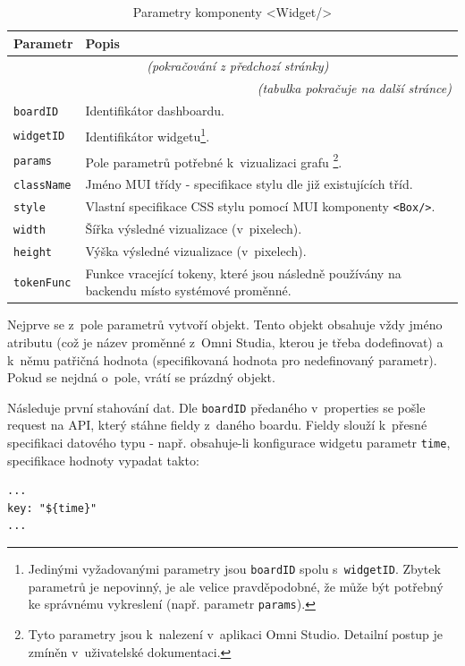\documentclass[czech, bc, kiv, he, iso690numb]{fasthesis}
\begin{document}
	\begin{longtable}{p{}p{}}
	\caption{Parametry komponenty <Widget/>}
	\label{tab:widgetProps}\\
	\toprule[1.5pt]
	\textbf{Parametr} & \textbf{Popis}\\
	\midrule
	\endfirsthead
	\multicolumn{2}{c}{\tablename{}~\thetable{} \textit{(pokračování z předchozí stránky)}}\\
	\endhead
	\midrule
	\multicolumn{2}{r}{\textit{(tabulka pokračuje na další stránce)}}\\
	\endfoot
	\bottomrule[1.5pt]
	\endlastfoot
	\verb"boardID" & Identifikátor dashboardu.  \\
	\midrule
	\verb"widgetID" & Identifikátor widgetu\footnote{Jedinými vyžadovanými parametry jsou \texttt{boardID} spolu s~\texttt{widgetID}. Zbytek parametrů je nepovinný, je ale velice pravděpodobné, že může být potřebný ke správnému vykreslení (např. parametr \texttt{params}).}. \\
	\midrule
	\verb"params" & Pole parametrů potřebné k~vizualizaci grafu \footnote{Tyto parametry jsou k~nalezení v~aplikaci Omni Studio. Detailní postup je zmíněn v~uživatelské dokumentaci.}. \\
	\midrule
	\verb"className" & Jméno MUI třídy - specifikace stylu dle již existujících tříd. \\
	\midrule
	\verb"style" & Vlastní specifikace CSS stylu pomocí MUI komponenty \texttt{<Box/>}. \\
	\midrule
	\verb"width" & Šířka výsledné vizualizace (v~pixelech). \\
	\midrule
	\verb"height" & Výška výsledné vizualizace (v~pixelech). \\
	\midrule
	\verb"tokenFunc" & Funkce vracející tokeny, které jsou následně používány na backendu místo systémové proměnné. \\
	\end{longtable}

Nejprve se z~pole parametrů vytvoří objekt. Tento objekt obsahuje vždy jméno atributu (což je název proměnné z~Omni Studia, kterou je třeba dodefinovat) a k~němu patřičná hodnota (specifikovaná
hodnota pro nedefinovaný parametr). Pokud se nejdná o~pole, vrátí se prázdný objekt.

Následuje první stahování dat. Dle \texttt{boardID} předaného v~properties se pošle request na API, který stáhne fieldy z~daného boardu. Fieldy slouží k~přesné specifikaci datového typu - např.
obsahuje-li konfigurace widgetu parametr \texttt{time}, specifikace hodnoty vypadat takto:
\lstset{style=plainsrc}
\begin{lstlisting}
...
key: "${time}"
...
\end{lstlisting}
\end{document}
